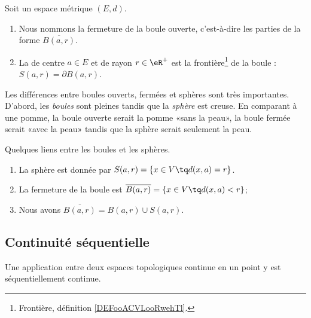 \begin{definition}      \label{DEFooPDSJooFcUqKH}
	Soit un espace métrique \( (E,d)\).
	\begin{enumerate}
		\item
		      Nous nommons  la fermeture de la boule ouverte, c'est-à-dire les parties de la forme \( \overline{ B(a,r) }\).
		\item
		      La  de centre \( a\in E\) et de rayon \( r\in \eR^+\) est la frontière\footnote{Frontière, définition \ref{DEFooACVLooRwehTl}.} de la boule : \( S(a,r)=\partial B(a,r)\).
	\end{enumerate}
\end{definition}

\begin{normaltext}
	Les différences entre boules ouverts, fermées et sphères sont très importantes. D'abord, les \emph{boules} sont pleines tandis que la \emph{sphère} est creuse. En comparant à une pomme, la boule ouverte serait la pomme «sans la peau», la boule fermée serait «avec la peau» tandis que la sphère serait seulement la peau.
\end{normaltext}

\begin{lemma}       \label{LEMooDYYYooHZitMZ}
	Quelques liens entre les boules et les sphères.
	\begin{enumerate}
		\item
		      La sphère est donnée par \( S(a,r)=\{ x\in V\tq d(x,a)=r \}\).
		\item
		      La fermeture de la boule est \( \overline{ B(a,r) }=\{ x\in V\tq d(x,a)<r \}\);
		\item
		      Nous avons \( \overline{ B(a,r) }=B(a,r)\cup S(a,r)\).
	\end{enumerate}
\end{lemma}

\subsection{Continuité séquentielle}

\begin{corollary}		\label{PropFnContParSuite}
	Une application entre deux espaces topologiques continue en un point y est séquentiellement continue.
\end{corollary}

